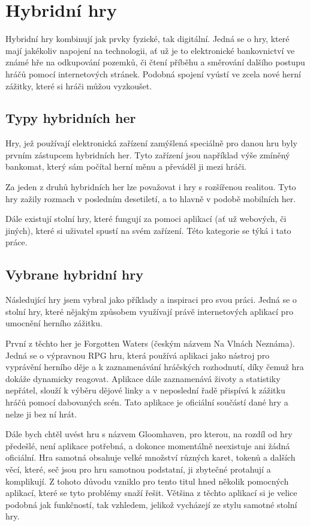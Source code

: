 \chapter{Hybridní hry}
Hybridní hry kombinují jak prvky fyzické, tak digitální. Jedná se o hry, které mají jakékoliv napojení na technologii, ať už je to elektronické bankovnictví ve známé hře na odkupování pozemků, či čtení příběhu a směrování dalšího postupu hráčů pomocí internetových stránek. Podobná spojení vyústí ve zcela nové herní zážitky, které si hráči můžou vyzkoušet.

\section{Typy hybridních her}
Hry, jež používají elektronická zařízení zamýšlená speciálně pro danou hru byly prvním zástupcem hybridních her. Tyto zařízení jsou například výše zmíněný bankomat, který sám počítal herní měnu a převáděl ji mezi hráči.

Za jeden z druhů hybridních her lze považovat i hry s rozšířenou realitou. Tyto hry zažily rozmach v posledním desetiletí, a to hlavně v podobě mobilních her.

Dále existují stolní hry, které fungují za pomoci aplikací (ať už webových, či jiných), které si uživatel spustí na svém zařízení. Této kategorie se týká i tato práce.

\section{Vybrane hybridní hry}
Následující hry jsem vybral jako příklady a inspiraci pro svou práci. Jedná se o stolní hry, které nějakým způsobem využívají právě internetových aplikací pro umocnění herního zážitku.

První z těchto her je Forgotten Waters (českým názvem Na Vlnách Neznáma). Jedná se o výpravnou RPG hru, která používá aplikaci jako nástroj pro vyprávění herního děje a k zaznamenávání hráčských rozhodnutí, díky čemuž hra dokáže dynamicky reagovat. Aplikace dále zaznamenává životy a statistiky nepřátel, slouží k výběru dějové linky a v neposlední řadě přispívá k zážitku hráčů pomocí dabovaných scén. Tato aplikace je oficiální součástí dané hry a nelze ji bez ní hrát.

Dále bych chtěl uvést hru s názvem Gloomhaven, pro kterou, na rozdíl od hry předešlé, není aplikace potřebná, a dokonce momentálně neexistuje ani žádná oficiální. Hra samotná obsahuje velké množství různých karet, tokenů a dalších věcí, které, seč jsou pro hru samotnou podstatní, ji zbytečné protahují a komplikují. Z tohoto důvodu vzniklo pro tento titul hned několik pomocných aplikací, které se tyto problémy snaží řešit. Většina z těchto aplikací si je velice podobná jak funkčností, tak vzhledem, jelikož vycházejí ze stylu samotné stolní hry.